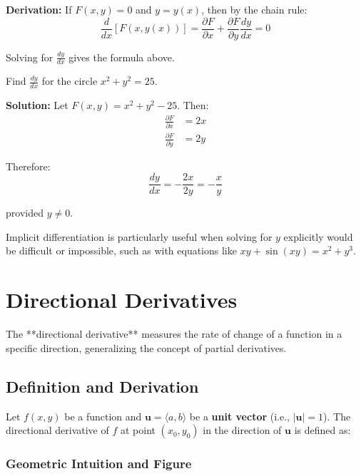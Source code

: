 \textbf{Derivation:} If \(F(x, y) = 0\) and \(y = y(x)\), then by the chain rule:
\[
  \frac{d}{dx}[F(x, y(x))] = \frac{\partial F}{\partial x} + \frac{\partial F}{\partial y} \frac{dy}{dx} = 0
\]

Solving for \(\frac{dy}{dx}\) gives the formula above.

\begin{eg}
  Find \(\frac{dy}{dx}\) for the circle \(x^2 + y^2 = 25\).

  \textbf{Solution:}
  Let \(F(x, y) = x^2 + y^2 - 25\). Then:
  \begin{align}
    \frac{\partial F}{\partial x} &= 2x \\
    \frac{\partial F}{\partial y} &= 2y
  \end{align}

  Therefore:
  \[
    \frac{dy}{dx} = -\frac{2x}{2y} = -\frac{x}{y}
  \]

  provided \(y \neq 0\).
\end{eg}

\begin{remark}
  Implicit differentiation is particularly useful when solving for \(y\) explicitly would be difficult or impossible, such as with equations like \(xy + \sin(xy) = x^2 + y^3\).
\end{remark}

\section{Directional Derivatives}
\label{sec:directional-derivatives}

The **directional derivative** measures the rate of change of a function in a specific direction, generalizing the concept of partial derivatives.

\subsection{Definition and Derivation}

Let \(f(x, y)\) be a function and \(\mathbf{u} = \langle a, b \rangle\) be a \textbf{unit vector} (i.e., \(|\mathbf{u}| = 1\)). The directional derivative of \(f\) at point \((x_0, y_0)\) in the direction of \(\mathbf{u}\) is defined as:

\subsubsection{Geometric Intuition and Figure}

